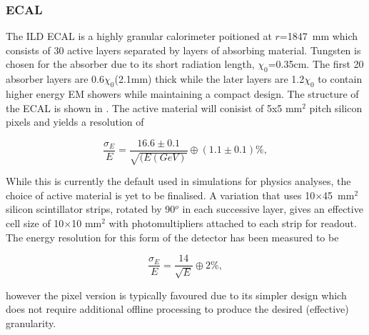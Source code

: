 \subsubsection{ECAL}
The \ac{ILD} \ac{ECAL} is a highly granular calorimeter poitioned at $r$=1847~mm which consists of 30 active layers separated by layers of absorbing material. Tungsten is chosen for the absorber due to its short radiation length, $\chi_0$=0.35cm. The first 20 absorber layers are 0.6$\chi_0$(2.1mm) thick while the later layers are  1.2$\chi_0$ to contain higher energy \ac{EM} showers while maintaining a compact design. The structure of the \ac{ECAL} is shown in . The active material will conisist of 5x5 mm$^2$ pitch silicon pixels and yields a resolution of

\begin{equation}
  \frac{\sigma_E}{E}=\frac{16.6\pm 0.1}{\sqrt{(E(GeV)}}\oplus(1.1\pm 0.1)\%,
\end{equation}

While this is currently the default used in simulations for physics analyses, the choice of active material is yet to be finalised. A variation that uses 10$\times$45~mm$^2$ silicon scintillator strips, rotated by 90${^o}$ in each successive layer, gives an effective cell size of 10$\times$10 mm$^2$ with photomultipliers attached to each strip for readout. The energy resolution for this form of the detector has been measured to be \cite{ILCTDR}

\begin{equation}
  \frac{\sigma_E}{E}=\frac{14}{\sqrt{E}}\oplus2\%,
\end{equation}

however the pixel version is typically favoured due to its simpler design which does not require additional offline processing to produce the desired (effective) granularity.

